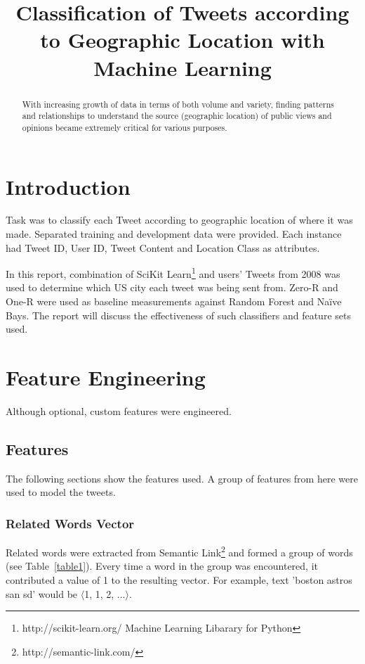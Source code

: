 \documentclass[11pt]{article}
\title{Classification of Tweets according to Geographic Location with Machine Learning}
\author{ }%
\begin{document}
\maketitle

\begin{abstract}
With increasing growth of data in terms of both volume and variety, finding patterns and relationships to understand the source (geographic location) of public views and opinions became extremely critical for various purposes.
\end{abstract}

\section{Introduction}
Task was to classify each Tweet according to geographic location of where it was made. Separated training and development data were provided. Each instance had Tweet ID, User ID, Tweet Content and Location Class as attributes.\newline

In this report, combination of 
SciKit Learn\footnote{http://scikit-learn.org/ Machine Learning Libarary for Python}
and users’ Tweets from 2008 was used to determine which US city each tweet was being sent from. Zero-R and One-R were used as baseline measurements against Random Forest and Na{\"i}ve Bays. The report will discuss the effectiveness of such classifiers and feature sets used.

\section{Feature Engineering}
Although optional, custom features were engineered.

\subsection{Features}
The following sections show the features used. A group of features from here were used to model the tweets.

\subsubsection{Related Words Vector}
Related words were extracted from Semantic Link\footnote{http://semantic-link.com/} and formed a group of words (see Table~\ref{table1}). Every time a word in the group was encountered, it contributed a value of 1 to the resulting vector. For example, text 'boston astros san sd' would be
$\langle$1, 1, 2, ...$\rangle$.\newline
\end{document}
